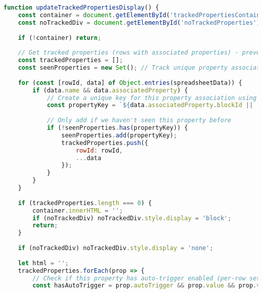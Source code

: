 \documentclass[12pt,a4paper]{article}
\begin{document}
\begin{lstlisting}[language=JavaScript, caption=Property Tracking Display]
function updateTrackedPropertiesDisplay() {
    const container = document.getElementById('trackedPropertiesContainer');
    const noTrackedDiv = document.getElementById('noTrackedProperties');
    
    if (!container) return;
    
    // Get tracked properties (rows with associated properties) - prevent duplicates
    const trackedProperties = [];
    const seenProperties = new Set(); // Track unique property associations
    
    for (const [rowId, data] of Object.entries(spreadsheetData)) {
        if (data.name && data.associatedProperty) {
            // Create a unique key for this property association using name and block ID
            const propertyKey = `${data.associatedProperty.blockId || 'root'}-${data.associatedProperty.name}`;
            
            // Only add if we haven't seen this property before
            if (!seenProperties.has(propertyKey)) {
                seenProperties.add(propertyKey);
                trackedProperties.push({
                    rowId: rowId,
                    ...data
                });
            }
        }
    }
    
    if (trackedProperties.length === 0) {
        container.innerHTML = '';
        if (noTrackedDiv) noTrackedDiv.style.display = 'block';
        return;
    }
    
    if (noTrackedDiv) noTrackedDiv.style.display = 'none';
    
    let html = '';
    trackedProperties.forEach(prop => {
        // Check if this property has auto-trigger enabled (per-row setting)
        const hasAutoTrigger = prop.autoTrigger && prop.value && prop.value.trim() !== '';
        

\end{lstlisting}
\end{document}
